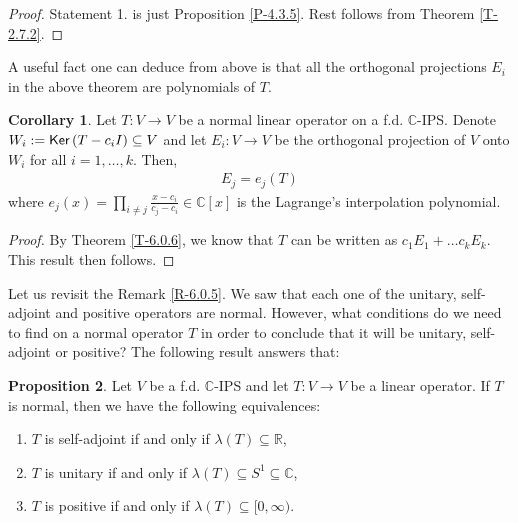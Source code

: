 \documentclass[letterpaper,11pt,twoside]{article}
\theoremstyle{definition}
\newtheorem{proposition}{Proposition}[subsection]
\theoremstyle{definition}
\theoremstyle{definition}
\theoremstyle{definition}
\theoremstyle{definition}
\theoremstyle{definition}
\theoremstyle{remark}
\theoremstyle{definition}
\newtheorem{corollary}[proposition]{Corollary}
\newcommand{\Ker}[1]{{\fontfamily{lmss}\selectfont 
		\text{Ker}\left (#1\right )
}}
\newcommand{\R}[0]{\mathbb{R}}
\newcommand{\C}{\mathbb{C}}
\begin{document}
    	\begin{proof}
		Statement 1. is just Proposition \ref{P-4.3.5}. Rest follows from Theorem \ref{T-2.7.2}.
    	\end{proof}
    	A useful fact one can deduce from above is that all the orthogonal projections $ E_i $ in the above theorem are polynomials of $ T $.
    	\begin{corollary}
    		Let $ T : V\to V $ be a normal linear operator on a f.d. $ \C $-IPS. Denote $ W_i := \Ker{T-c_iI} \subseteq V$ and let $ E_i : V\to V $ be the orthogonal projection of $ V $ onto $ W_i $ for all $ i=1,\dots,k $. Then, 
    		\begin{align*}
    			E_j = e_j(T)
    		\end{align*}
    		where $ e_j(x) = \prod_{i\neq j}\frac{x-c_i}{c_j-c_i} \in \C[x]$ is the Lagrange's interpolation polynomial. 
    	\end{corollary}
    \begin{proof}
    	By Theorem \ref{T-6.0.6}, we know that $ T $ can be written as $ c_1E_1+\dots c_k E_k $. This result then follows.
    \end{proof}
    Let us revisit the Remark \ref{R-6.0.5}. We saw that each one of the unitary, self-adjoint and positive operators are normal. However, what conditions do we need to find on a normal operator $ T $ in order to conclude that it will be unitary, self-adjoint or positive? The following result answers that:
    \begin{proposition}\label{P-6.0.8}
    	Let $ V $ be a f.d. $ \C $-IPS and let $ T: V\to V $ be a linear operator. If $ T $ is normal, then we have the following equivalences:
    	\begin{enumerate}
    		\item {$ T $ is self-adjoint if and only if $ \lambda(T) \subseteq \R $,}
    		\item {$ T $ is unitary if and only if $ \lambda(T)\subseteq S^{1}\subseteq  \C$,}
    		\item {$ T $ is positive if and only if $ \lambda(T) \subseteq [0,\infty) $.}
    	\end{enumerate}
    \end{proposition}
\end{document}

